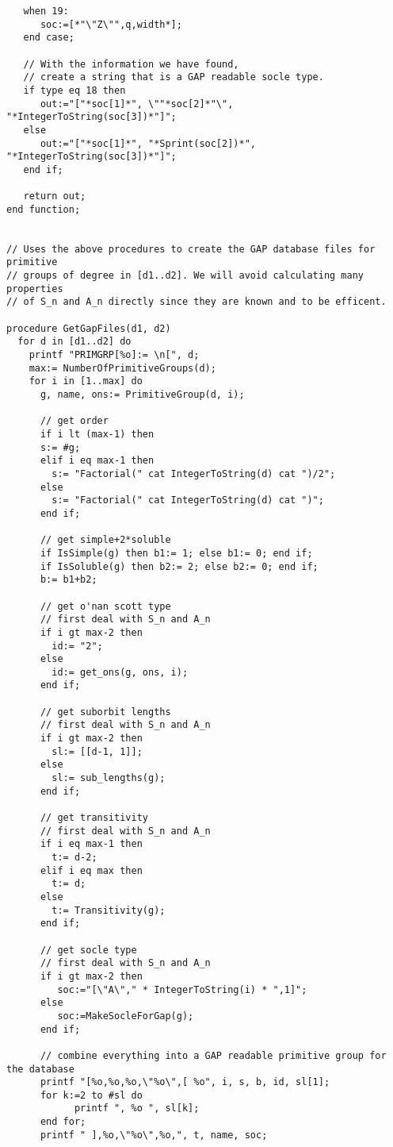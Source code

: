 \documentclass[]{article}
\theoremstyle{definition}
\begin{document}
\begin{verbatim}
   when 19:
      soc:=[*"\"Z\"",q,width*];
   end case;
  
   // With the information we have found,
   // create a string that is a GAP readable socle type.
   if type eq 18 then
      out:="["*soc[1]*", \""*soc[2]*"\", "*IntegerToString(soc[3])*"]";
   else
      out:="["*soc[1]*", "*Sprint(soc[2])*", "*IntegerToString(soc[3])*"]";
   end if;

   return out;
end function;


// Uses the above procedures to create the GAP database files for primitive
// groups of degree in [d1..d2]. We will avoid calculating many properties 
// of S_n and A_n directly since they are known and to be efficent.

procedure GetGapFiles(d1, d2)
  for d in [d1..d2] do
    printf "PRIMGRP[%o]:= \n[", d;
    max:= NumberOfPrimitiveGroups(d);
    for i in [1..max] do
      g, name, ons:= PrimitiveGroup(d, i);
      
      // get order
      if i lt (max-1) then
      s:= #g;
      elif i eq max-1 then
        s:= "Factorial(" cat IntegerToString(d) cat ")/2";
      else
        s:= "Factorial(" cat IntegerToString(d) cat ")";
      end if;
      
      // get simple+2*soluble
      if IsSimple(g) then b1:= 1; else b1:= 0; end if;
      if IsSoluble(g) then b2:= 2; else b2:= 0; end if;
      b:= b1+b2;
      
      // get o'nan scott type
      // first deal with S_n and A_n
      if i gt max-2 then
        id:= "2";
      else
        id:= get_ons(g, ons, i);
      end if;
      
      // get suborbit lengths
      // first deal with S_n and A_n
      if i gt max-2 then
        sl:= [[d-1, 1]];
      else
        sl:= sub_lengths(g);
      end if;

      // get transitivity
      // first deal with S_n and A_n
      if i eq max-1 then
        t:= d-2;
      elif i eq max then
        t:= d;
      else
        t:= Transitivity(g);
      end if;
      
      // get socle type
      // first deal with S_n and A_n
      if i gt max-2 then
         soc:="[\"A\"," * IntegerToString(i) * ",1]";
      else
         soc:=MakeSocleForGap(g);
      end if;

      // combine everything into a GAP readable primitive group for the database
      printf "[%o,%o,%o,\"%o\",[ %o", i, s, b, id, sl[1];
      for k:=2 to #sl do
            printf ", %o ", sl[k];
      end for;
      printf " ],%o,\"%o\",%o,", t, name, soc;
      

\end{verbatim}
\end{document}
